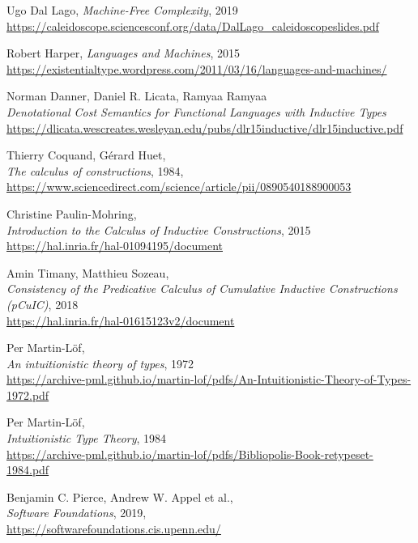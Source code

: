 \documentclass[declaration,mgr,english,shortabstract]{iithesis}
\begin{document}
\begin{thebibliography}{1}
    Ugo Dal Lago,
    \textit{Machine-Free Complexity},
    2019 \\
    \url{https://caleidoscope.sciencesconf.org/data/DalLago_caleidoscopeslides.pdf}

    Robert Harper, \textit{Languages and Machines}, 2015 \\
    \url{https://existentialtype.wordpress.com/2011/03/16/languages-and-machines/}

    Norman Danner, Daniel R. Licata, Ramyaa Ramyaa \\
    \textit{Denotational Cost Semantics for
    Functional Languages with Inductive Types} \\
    \url{https://dlicata.wescreates.wesleyan.edu/pubs/dlr15inductive/dlr15inductive.pdf}

    Thierry Coquand, Gérard Huet, \\
    \textit{The calculus of constructions}, 1984, \\
    \url{https://www.sciencedirect.com/science/article/pii/0890540188900053}

    Christine Paulin-Mohring, \\
    \textit{Introduction to the Calculus of Inductive Constructions}, 2015 \\
    \url{https://hal.inria.fr/hal-01094195/document}

    Amin Timany, Matthieu Sozeau, \\
    \textit{Consistency of the Predicative Calculus of Cumulative
    Inductive Constructions (pCuIC)}, 2018 \\
    \url{https://hal.inria.fr/hal-01615123v2/document}

    Per Martin-L\"{o}f, \\
    \textit{An intuitionistic theory of types}, 1972 \\
    \url{https://archive-pml.github.io/martin-lof/pdfs/An-Intuitionistic-Theory-of-Types-1972.pdf}

    Per Martin-L\"{o}f, \\
    \textit{Intuitionistic Type Theory}, 1984 \\
    \url{https://archive-pml.github.io/martin-lof/pdfs/Bibliopolis-Book-retypeset-1984.pdf}
    
    Benjamin C. Pierce, Andrew W. Appel et al., \\
    \textit{Software Foundations}, 2019, \\
    \url{https://softwarefoundations.cis.upenn.edu/}


\end{thebibliography}
\end{document}
